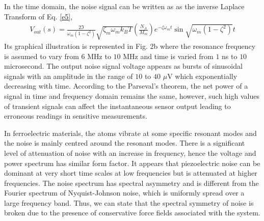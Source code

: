 \documentclass[12pt,column,showpacs,pre,preprintnumbers,amsmath,amssymb,aps,standalone]{revtex4-2}
\begin{document}
In the time domain, the noise signal can be written as as the inverse Laplace Transform of Eq. \ref{e5}, 
\begin{align} \label{e11}
V_{out}(s)=\frac{2\Im}{\omega_m(1-\zeta^2)}
\sqrt{\zeta_m\omega_m k_BT}\left(\frac{N_A}{M_m}\right)e^{-\zeta\omega_m t}\sin{\sqrt{\omega_m(1-\zeta^2)} t}  
\end{align}  
Its graphical illustration is represented in Fig. 2b where the resonance frequency is assumed to vary from $6$ MHz to $10$ MHz and time is varied from $ 1 $ ns to $ 10 $ microsecond. The output noise signal voltage appears as bursts of sinusoidal signals with an amplitude in the range of $ 10 $ to $ 40 $ $\mu$V which exponentially decreasing with time. According to the Parseval's theorem, the net power of a signal in time and frequency domain remains the same, however, such high values of transient signals can affect the instantaneous sensor output leading to erroneous readings in sensitive measurements. 

In ferroelectric materials, the atoms vibrate at some specific resonant modes and the noise is mainly centred around the resonant modes. There is a significant level of attenuation of noise with an increase in frequency, hence the voltage and power spectrum has similar form factor. It appears that piezoelectric noise can be dominant at very short time scales at low frequencies but is attenuated at higher frequencies. The noise spectrum has spectral asymmetry and is different from the Fourier spectrum of Nyquist-Johnson noise, which is uniformly spread over a large frequency band. Thus, we can state that the spectral symmetry of noise is broken due to the presence of conservative force fields associated with the system.
\end{document}
